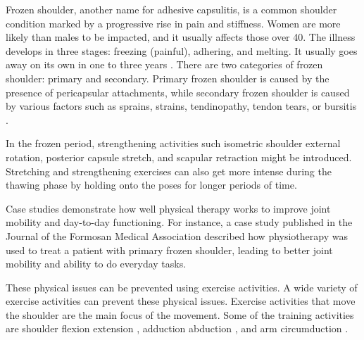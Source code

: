 Frozen shoulder, another name for adhesive capsulitis, is a common shoulder condition marked by a progressive rise in pain and stiffness. Women are more likely than males to be impacted, and it usually affects those over 40. The illness develops in three stages: freezing (painful), adhering, and melting. It usually goes away on its own in one to three years \cite{FrozenShoulder2}. There are two categories of frozen shoulder: primary and secondary. Primary frozen shoulder is caused by the presence of pericapsular attachments, while secondary frozen shoulder is caused by various factors such as sprains, strains, tendinopathy, tendon tears, or bursitis \cite{FrozenShoulder1}.

In the frozen period, strengthening activities such isometric shoulder external rotation, posterior capsule stretch, and scapular retraction might be introduced. Stretching and strengthening exercises can also get more intense during the thawing phase by holding onto the poses for longer periods of time.

Case studies demonstrate how well physical therapy works to improve joint mobility and day-to-day functioning. For instance, a case study published in the Journal of the Formosan Medical Association described how physiotherapy was used to treat a patient with primary frozen shoulder, leading to better joint mobility and ability to do everyday tasks.

These physical issues can be prevented using exercise activities. A wide variety of exercise activities can prevent these physical issues. Exercise activities that move the shoulder are the main focus of the movement. Some of the training activities are shoulder flexion extension \cite{ShoulderFlexionExtension}, adduction abduction \cite{AdductionAbduction}, and arm circumduction \cite{ArmCircumduction}.

